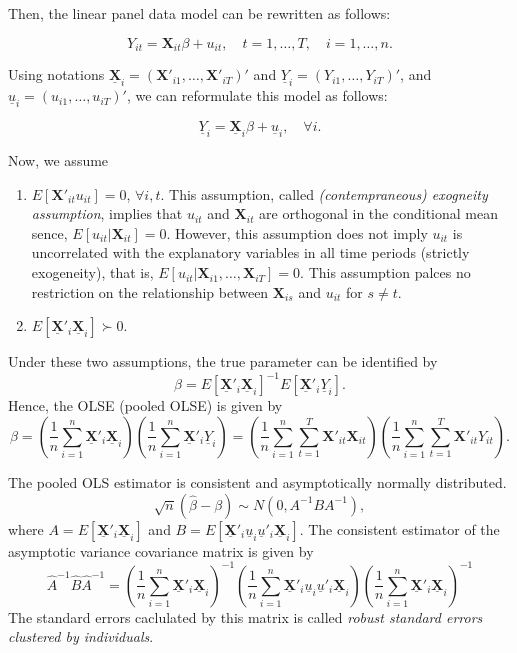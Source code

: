 \documentclass[
  12pt,
]{article}
\providecommand{\tightlist}{%
  \setlength{\itemsep}{0pt}\setlength{\parskip}{0pt}}
\begin{document}
Then, the linear panel data model can be rewritten as follows:

\[
  Y_{it} = \mathbf{X}_{it} \beta + u_{it}, \quad t = 1, \ldots, T, \quad i = 1, \ldots, n.
\]

Using notations
\(\underline{\mathbf{X}}_i = (\mathbf{X}'_{i1}, \ldots, \mathbf{X}'_{iT})'\)
and \(\underline{Y}_i = (Y_{i1}, \ldots, Y_{iT})'\), and
\(\underline{u}_i = (u_{i1}, \ldots, u_{iT})'\), we can reformulate this
model as follows:

\[
  \underline{Y}_i = \underline{\mathbf{X}}_i \beta + \underline{u}_i, \quad \forall i.
\]

Now, we assume

\begin{enumerate}
\def\labelenumi{\arabic{enumi}.}
\tightlist
\item
  \(E[\mathbf{X}'_{it}u_{it}] = 0\), \(\forall i, t\). This assumption,
  called \emph{(contempraneous) exogneity assumption}, implies that
  \(u_{it}\) and \(\mathbf{X}_{it}\) are orthogonal in the conditional
  mean sence, \(E[u_{it} | \mathbf{X}_{it}] = 0\). However, this
  assumption does not imply \(u_{it}\) is uncorrelated with the
  explanatory variables in all time periods (strictly exogeneity), that
  is, \(E[u_{it} | \mathbf{X}_{i1}, \ldots, \mathbf{X}_{iT}] = 0\). This
  assumption palces no restriction on the relationship between
  \(\mathbf{X}_{is}\) and \(u_{it}\) for \(s\not=t\).
\item
  \(E[\underline{\mathbf{X}}'_i\underline{\mathbf{X}}_i] \succ 0\).
\end{enumerate}

Under these two assumptions, the true parameter can be identified by \[
  \beta = E[\underline{\mathbf{X}}'_i\underline{\mathbf{X}}_i]^{-1} E[\underline{\mathbf{X}}'_i\underline{Y}_i].
\] Hence, the OLSE (pooled OLSE) is given by \[
  \hat{\beta} 
  = \left( \frac{1}{n} \sum_{i=1}^n \underline{\mathbf{X}}'_i\underline{\mathbf{X}}_i \right)
  \left( \frac{1}{n} \sum_{i=1}^n \underline{\mathbf{X}}'_i\underline{Y}_i \right)
  = \left( \frac{1}{n} \sum_{i=1}^n \sum_{t=1}^T \mathbf{X}'_{it} \mathbf{X}_{it} \right)
  \left( \frac{1}{n} \sum_{i=1}^n \sum_{t=1}^T \mathbf{X}'_{it} Y_{it} \right).
\]

The pooled OLS estimator is consistent and asymptotically normally
distributed. \[
  \sqrt{n}(\hat{\beta} - \beta) \sim N(0, A^{-1} B A^{-1}),
\] where \(A = E[\underline{\mathbf{X}}'_i\underline{\mathbf{X}}_i]\)
and
\(B = E[\underline{\mathbf{X}}'_i \underline{u}_i \underline{u}'_i \underline{\mathbf{X}}_i]\).
The consistent estimator of the asymptotic variance covariance matrix is
given by \[
  \hat{A}^{-1} \hat{B} \hat{A}^{-1} = 
  \left( \frac{1}{n} \sum_{i=1}^n \underline{\mathbf{X}}'_i\underline{\mathbf{X}}_i \right)^{-1}
  \left( \frac{1}{n} \sum_{i=1}^n \underline{\mathbf{X}}'_i \underline{u}_i \underline{u}'_i \underline{\mathbf{X}}_i \right)
  \left( \frac{1}{n} \sum_{i=1}^n \underline{\mathbf{X}}'_i\underline{\mathbf{X}}_i \right)^{-1}
\] The standard errors caclulated by this matrix is called \emph{robust
standard errors clustered by individuals}.
\end{document}
